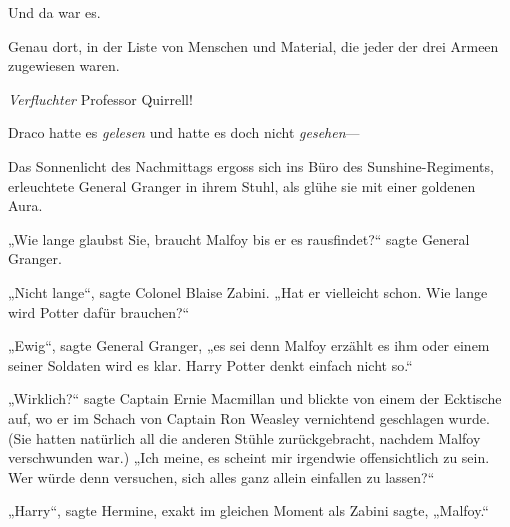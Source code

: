 Und da war es.

Genau dort, in der Liste von Menschen und Material, die jeder der drei Armeen zugewiesen waren.

\emph{Verfluchter} Professor Quirrell!

Draco hatte es \emph{gelesen} und hatte es doch nicht \emph{gesehen}—

\later

Das Sonnenlicht des Nachmittags ergoss sich ins Büro des Sunshine-Regiments, erleuchtete General Granger in ihrem Stuhl, als glühe sie mit einer goldenen Aura.

„Wie lange glaubst Sie, braucht Malfoy bis er es rausfindet?“ sagte General Granger.

„Nicht lange“, sagte Colonel Blaise Zabini. „Hat er vielleicht schon. Wie lange wird Potter dafür brauchen?“

„Ewig“, sagte General Granger, „es sei denn Malfoy erzählt es ihm oder einem seiner Soldaten wird es klar. Harry Potter denkt einfach nicht so.“

„Wirklich?“ sagte Captain Ernie Macmillan und blickte von einem der Ecktische auf, wo er im Schach von Captain Ron Weasley vernichtend geschlagen wurde. (Sie hatten natürlich all die anderen Stühle zurückgebracht, nachdem Malfoy verschwunden war.) „Ich meine, es scheint mir irgendwie offensichtlich zu sein. Wer würde denn versuchen, sich alles ganz allein einfallen zu lassen?“

„Harry“, sagte Hermine, exakt im gleichen Moment als Zabini sagte, „Malfoy.“

